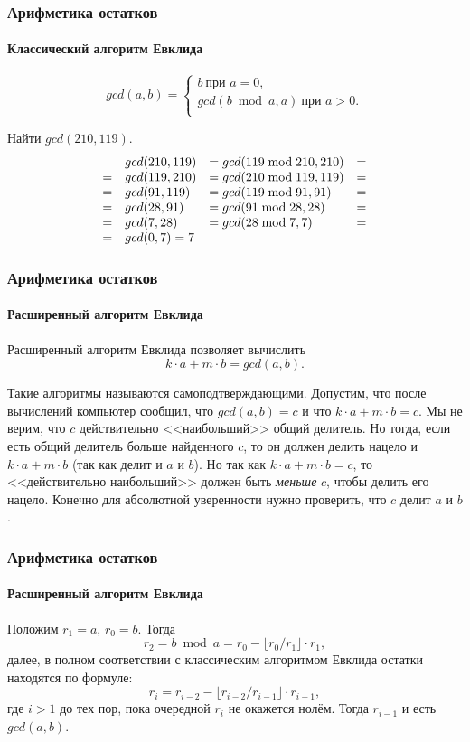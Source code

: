\begin{frame}
    \frametitle{Арифметика остатков}
    \framesubtitle{Классический алгоритм Евклида}
    
    \[
    gcd(a, b)=
    \begin{cases}
    b\ \text{при $a=0$},\\
    gcd(b \bmod a, a)\ \text{при $a>0$}.\\
    \end{cases}
    \]

    \begin{example}
        Найти $gcd(210, 119)$.
        \[
        \begin{array}[c]{llll}
         &gcd(210,119)&=gcd(119 \bmod 210, 210)&=\\
        =&gcd(119,210)&=gcd(210\bmod 119, 119)&=\\
        =&gcd(91,119)&=gcd(119 \bmod 91, 91)&=\\
        =&gcd(28,91)&=gcd(91 \bmod 28, 28)&=\\
        =&gcd(7,28)&=gcd(28\bmod 7, 7)&=\\
        =&gcd(0,7) = 7
        \end{array}
        \]
    \end{example}
\end{frame}


\begin{frame}
    \frametitle{Арифметика остатков}
    \framesubtitle{Расширенный алгоритм Евклида}
    
    Расширенный алгоритм Евклида позволяет вычислить 
    \begin{equation}\label{eq:gcdCommon}
        k\cdot a + m\cdot b = gcd(a, b).
    \end{equation}

    Такие алгоритмы называются \alert{самоподтверждающими}. Допустим, что после вычислений компьютер сообщил, что $gcd(a, b)=c$ и что $k\cdot a + m\cdot b=c$. Мы не верим, что $c$ действительно <<наибольший>> общий делитель. Но тогда, если есть общий делитель больше найденного $c$, то он должен делить нацело и $k\cdot a + m\cdot b$ (так как делит и $a$ и $b$). Но так как $k\cdot a + m\cdot b=c$, то <<действительно наибольший>> должен быть \emph{меньше} $c$, чтобы делить его нацело. Конечно для абсолютной уверенности нужно проверить, что $c$ делит $a$ и $b$.

\end{frame}


\begin{frame}
    \frametitle{Арифметика остатков}
    \framesubtitle{Расширенный алгоритм Евклида}
    
    Положим $r_1=a$, $r_0=b$. Тогда 
    \[r_2=b \bmod a=r_0 - \lfloor r_0/r_1\rfloor\cdot r_1,\]
    далее, в полном соответствии с классическим алгоритмом Евклида остатки находятся по формуле:
    \begin{equation}\label{eq:gcdIterative}
        r_{i}=r_{i-2} - \lfloor r_{i-2}/r_{i-1}\rfloor\cdot r_{i-1},
    \end{equation}
    где $i>1$ до тех пор, пока очередной $r_{i}$ не окажется нолём. Тогда $r_{i-1}$ и есть $gcd(a, b)$.
\end{frame}


